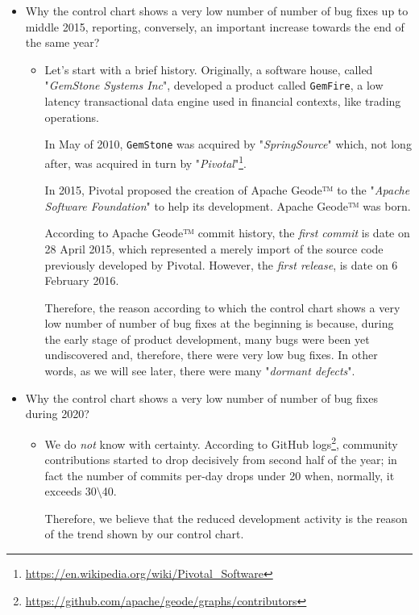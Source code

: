 \documentclass[sigconf]{acmart}
\begin{document}
\begin{itemize}
\item Why the control chart shows a very low number of number of bug fixes up to middle 2015, reporting, conversely, an important increase towards the end of the same year?
\begin{itemize}
\item Let's start with a brief history. Originally, a software house, called "\textit{GemStone Systems Inc}", developed a product called \texttt{GemFire}, a low latency transactional data engine used in financial contexts, like trading operations.

In May of 2010, \texttt{GemStone} was acquired by "\textit{SpringSource}" which, not long after, was acquired in turn by "\textit{Pivotal}"\footnote{\url{https://en.wikipedia.org/wiki/Pivotal_Software}}.

In 2015, Pivotal proposed the creation of Apache Geode™ to the "\textit{Apache Software Foundation}" to help its development. Apache Geode™ was born.

According to Apache Geode™ commit history, the \textit{first commit} is date on 28 April 2015, which represented a merely import of the source code previously developed by Pivotal. However, the \textit{first release}, is date on 6 February 2016.

Therefore, the reason according to which the control chart shows a very low number of number of bug fixes at the beginning is because, during the early stage of product development, many bugs were been yet undiscovered and, therefore, there were very low bug fixes. In other words, as we will see later, there were many "\textit{dormant defects}".
\end{itemize}

\item Why the control chart shows a very low number of number of bug fixes during 2020?
\begin{itemize}
\item We do \textit{not} know with certainty. According to GitHub logs\footnote{\url{https://github.com/apache/geode/graphs/contributors}}, community contributions started to drop decisively from second half of the year; in fact the number of commits per-day drops under 20 when, normally, it exceeds 30$\setminus$40. 

Therefore, we believe that the reduced development activity is the reason of the trend shown by our control chart.
\end{itemize}


\end{itemize}
\end{document}
